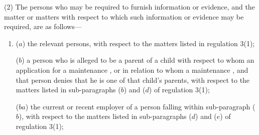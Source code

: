 \documentclass[a4paper,12pt]{article}
\begin{document}
(2) The persons who may be required to furnish information or evidence, and the matter or matters with respect to which such information or evidence may be required, are as follows—
\begin{enumerate}\item[]
($a$) the relevant persons, with respect to the matters listed in regulation 3(1);


($b$) a person who is alleged to be a parent of a child with respect to whom an application for a maintenance 
,  %
or in relation to whom a maintenance 
,  %
and that person  %
denies that he is one of that child’s parents, with respect to the matters listed in sub-paragraphs ($b$) and ($d$) of regulation 3(1);

($ba$) the current or recent employer of a person falling within sub-\hspace{0pt}paragraph ($b$), with respect to the matters listed in sub-\hspace{0pt}paragraphs ($d$) and ($e$) of regulation 3(1);


\end{enumerate}
\end{document}

